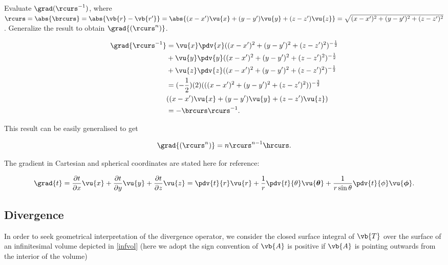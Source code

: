 \documentclass[english,a4paper,12pt]{report}
\begin{document}
{Evaluate \(\grad({\rcurs ^{-1} })\), where \(\rcurs = \abs{\brcurs} = \abs{\vb{r} - \vb{r'}} = \abs{(x - x')\vu{x} + (y - y')\vu{y} + (z - z')\vu{z}} = \sqrt{(x-x')^2+(y-y')^2+(z-z')^2}\). Generalize the result to obtain \(\grad{(\rcurs^n)}\).}
{\begin{equation} 
	\begin{aligned} 
		\grad{\rcurs ^{-1} } &= \vu{x}\pdv{x}((x - x')^2 + (y - y')^2 + (z - z')^2)^{-\frac{1}{2}} \\ &+ \vu{y}\pdv{y}((x - x')^2 + (y - y')^2 + (z - z')^2)^{-\frac{1}{2}} \\ &+ \vu{z}\pdv{z}((x - x')^2 + (y - y')^2 + (z - z')^2)^{-\frac{1}{2}} \\ &= (-\frac{1}{2})(2)(((x - x')^2 + (y - y')^2 + (z - z')^2))^{-\frac{3}{2}} \\ &((x - x')\vu{x} + (y - y')\vu{y} + (z - z')\vu{z}) \\ &=- \brcurs \rcurs ^{-1} . 
	\end{aligned} 
\end{equation}
		
This result can be easily generalised to get
		
\begin{equation} 
	\grad{(\rcurs^n)} = n\rcurs^{n-1}\hrcurs. \label{gradrcurs} 
\end{equation}}

The gradient in Cartesian and spherical coordinates are stated here for reference:

\begin{equation} 
	\grad{t} = \frac{\partial t}{\partial x} \vu{x} + \frac{\partial t}{\partial y} \vu{y} + \frac{\partial t}{\partial z} \vu{z} = \pdv{t}{r}\vu{r} + \frac{1}{r}\pdv{t}{\theta}\vu{\boldsymbol{\theta } } + \frac{1}{r\sin{\theta}}\pdv{t}{\phi}\vu{\boldsymbol{\phi } }. 
\end{equation}
	
\subsection{Divergence}

	
In order to seek geometrical interpretation of the divergence operator, we consider the closed surface integral of \(\vb{T}\) over the surface of an infinitesimal volume depicted in \cref{infvol} (here we adopt the sign convention of \(\vb{A}\) is positive if \(\vb{A}\) is pointing outwards from the interior of the volume)
\end{document}
